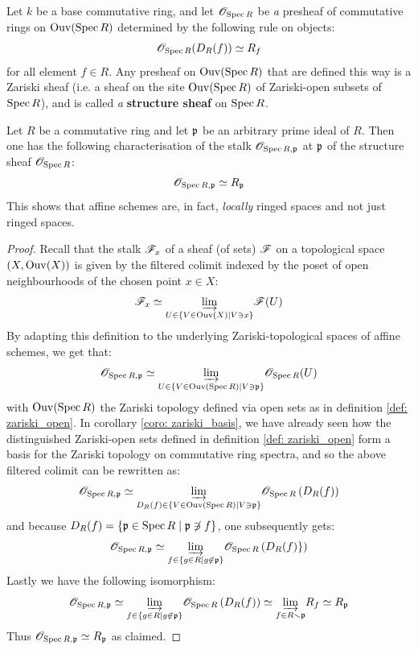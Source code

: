             \begin{proposition} \label{prop: structure_sheaf} 
                Let $k$ be a base commutative ring, and let $\mathscr{O}_{\operatorname{Spec} R}$ be \textit{a} presheaf of commutative rings on $\mathrm{Ouv}(\operatorname{Spec} R)$ determined by the following rule on objects:
                    $$\mathscr{O}_{\operatorname{Spec} R}(D_R(f)) \simeq R_f$$
                for all element $f \in R$. Any presheaf on $\mathrm{Ouv}(\operatorname{Spec} R)$ that are defined this way is a Zariski sheaf (i.e. a sheaf on the site $\mathrm{Ouv}(\operatorname{Spec} R)$ of Zariski-open subsets of $\operatorname{Spec} R$), and is called \textit{a} \textbf{structure sheaf} on $\operatorname{Spec} R$.
            \end{proposition}
            \begin{corollary} \label{coro: locality_of_stalks_of_structure_sheaves}
                Let $R$ be a commutative ring and let $\mathfrak{p}$ be an arbitrary prime ideal of $R$. Then one has the following characterisation of the stalk $\mathscr{O}_{\operatorname{Spec} R, \mathfrak{p}}$ at $\mathfrak{p}$ of the structure sheaf $\mathscr{O}_{\operatorname{Spec} R}$:
                    $$\mathscr{O}_{\operatorname{Spec} R, \mathfrak{p}} \simeq R_{\mathfrak{p}}$$
                This shows that affine schemes are, in fact, \textit{locally} ringed spaces and not just ringed spaces. 
            \end{corollary} 
                \begin{proof}
                    Recall that the stalk $\mathscr{F}_x$ of a sheaf (of sets) $\mathscr{F}$ on a topological space $(X, \mathrm{Ouv}(X))$ is given by the filtered colimit indexed by the poset of open neighbourhoods of the chosen point $x \in X$:
                        $$\mathscr{F}_x \simeq \underset{U \in \{V \in \mathrm{Ouv}(X) \mid V \ni x\}}{\varinjlim} \mathscr{F}(U)$$
                    By adapting this definition to the underlying Zariski-topological spaces of affine schemes, we get that:
                        $$\mathscr{O}_{\operatorname{Spec} R, \mathfrak{p}} \simeq \underset{U \in \{V \in \mathrm{Ouv}(\operatorname{Spec} R) \mid V \ni \mathfrak{p}\}}{\varinjlim} \mathscr{O}_{\operatorname{Spec} R}(U)$$
                    with $\mathrm{Ouv}(\operatorname{Spec} R)$ the Zariski topology defined via open sets as in definition \ref{def: zariski_open}. In corollary \ref{coro: zariski_basis}, we have already seen how the distinguished Zariski-open sets defined in definition \ref{def: zariski_open} form a basis for the Zariski topology on commutative ring spectra, and so the above filtered colimit can be rewritten as:
                        $$\mathscr{O}_{\operatorname{Spec} R, \mathfrak{p}} \simeq \underset{D_R(f) \in \{V \in \mathrm{Ouv}(\operatorname{Spec} R) \mid V \ni \mathfrak{p}\}}{\varinjlim} \mathscr{O}_{\operatorname{Spec} R}\left(D_R(f)\right)$$
                    and because $D_R(f) = \{\mathfrak{p} \in \operatorname{Spec} R \mid \mathfrak{p} \not \ni f\}$, one subsequently gets:
                        $$\mathscr{O}_{\operatorname{Spec} R, \mathfrak{p}} \simeq \underset{f \in \{g \in R \mid g \not \in \mathfrak{p}\}}{\varinjlim} \mathscr{O}_{\operatorname{Spec} R}\left(D_R(f)\}\right)$$
                    Lastly we have the following isomorphism:
                        $$\mathscr{O}_{\operatorname{Spec} R, \mathfrak{p}} \simeq \underset{f \in \{g \in R \mid g \not \in \mathfrak{p}\}}{\varinjlim} \mathscr{O}_{\operatorname{Spec} R}\left(D_R(f)\right) \simeq \underset{f \in R \smallsetminus \mathfrak{p}}{\varinjlim} R_f \simeq R_{\mathfrak{p}}$$
                    Thus $\mathscr{O}_{\operatorname{Spec} R, \mathfrak{p}} \simeq R_{\mathfrak{p}}$ as claimed.
                \end{proof}
                
